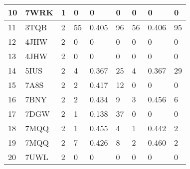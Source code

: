 \begin{table}[p]
{\begin{tabular}{|l|l|l|lll|lll|}
10          & 7WRK        & 1                 & 0                         & 0                & 0                     & 0                     & 0                & 0                                 \\ 
\hline \hline
11          & 3TQB        & 2                 & 55                        & 0.405            & 96                    & 56                    & 0.406            & 95                                \\
12          & 4JHW        & 2                 & 0                         & 0                & 0                     & 0                     & 0                & 0                                 \\
13          & 4JHW        & 2                 & 0                         & 0                & 0                     & 0                     & 0                & 0                                 \\
14          & 5IUS        & 2                 & 4                         & 0.367            & 25                    & 4                     & 0.367            & 29                                \\
15          & 7A8S        & 2                 & 2                         & 0.417            & 12                    & 0                     & 0                & 0                                 \\
16          & 7BNY        & 2                 & 2                         & 0.434            & 9                     & 3                     & 0.456            & 6                                 \\
17          & 7DGW        & 2                 & 1                         & 0.138            & 37                    & 0                     & 0                & 0                                 \\
18          & 7MQQ        & 2                 & 1                         & 0.455            & 4                     & 1                     & 0.442            & 2                                 \\
19          & 7MQQ        & 2                 & 7                         & 0.426            & 8                     & 2                     & 0.460            & 2                                 \\
20          & 7UWL        & 2                 & 0                         & 0                & 0                     & 0                     & 0                & 0                                 \\ 

\end{tabular}}
\end{table}
